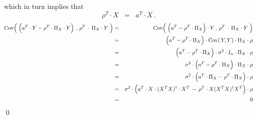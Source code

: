 which in turn implies that
\begin{equation*}
\rho^{T} \cdot X
\;\; = \;\;
	a^{T} \cdot X\,.
\end{equation*}
\begin{eqnarray*}
\Cov\!\left(\;
	\left(a^{T} \cdot Y
	\overset{{\color{white}.}}{-}
	\rho^{T} \cdot \Pi_{X} \cdot Y\right)
	\,,\,
	\rho^{T} \overset{{\color{white}+}}{\cdot} \Pi_{X} \cdot Y
	\;\right)
&=&
	\Cov\!\left(\;
		\left(a^{T} \overset{{\color{white}.}}{-} \rho^{T} \cdot \Pi_{X} \right) \cdot Y
		\,,\,
		\rho^{T} \overset{{\color{white}+}}{\cdot} \Pi_{X} \cdot Y
		\;\right)
\\
&=&
	\left(a^{T} \overset{{\color{white}.}}{-} \rho^{T} \cdot \Pi_{X} \right)
	\cdot \Cov\!\left(\,Y,Y\right) \cdot \Pi_{X} \cdot \rho
\\
&=&
	\left(a^{T} \overset{{\color{white}.}}{-} \rho^{T} \cdot \Pi_{X} \right)
	\cdot \sigma^{2} \cdot I_{n} \cdot \Pi_{X} \cdot \rho
\\
&=&
	\sigma^{2}
	\cdot
	\left(a^{T} \overset{{\color{white}.}}{-} \rho^{T} \cdot \Pi_{X} \right)
	\cdot \Pi_{X} \cdot \rho
\\
&=&
	\sigma^{2}
	\cdot
	\left(a^{T} \cdot \Pi_{X} \overset{{\color{white}.}}{-} \rho^{T} \cdot \Pi_{X} \right)
	\cdot \rho
\\
&=&
	\sigma^{2}
	\cdot
	\left(a^{T} \cdot X\cdot(X^{T}X)^{\dagger}\cdot X^{T}
	\,\overset{{\color{white}.}}{-}\,
	\rho^{T} \cdot X(X^{T}X)^{\dagger}X^{T} \right)
	\cdot \rho
\\
&=&
	0
\end{eqnarray*}
\qed


